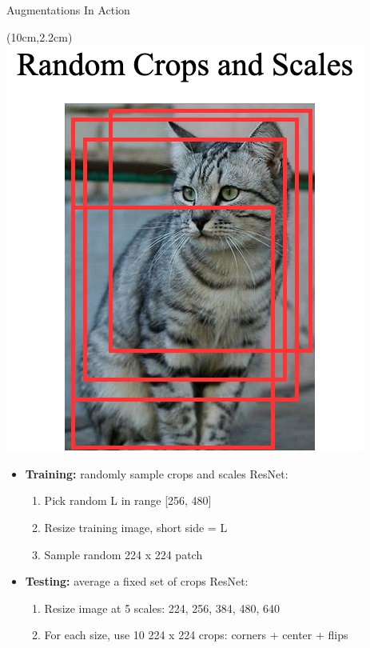 \documentclass[serif, aspectratio=169]{beamer}
\begin{document}
\begin{frame}{Augmentations In Action}
	\begin{textblock*}{5cm}(10cm,2.2cm) %
		\includegraphics[keepaspectratio, scale=0.28]{pic/crop}
	\end{textblock*}

	\begin{itemize}
	\item \textbf{Training:} randomly sample crops and scales \newline ResNet:
		\begin{enumerate}
				\item Pick random L in range [256, 480]
				\item Resize training image, short side = L
				\item Sample random 224 x 224 patch
		\end{enumerate}
		
	\item \textbf{Testing:} average a fixed set of crops \newline ResNet:
		\begin{enumerate}
			\item Resize image at 5 scales: {224, 256, 384, 480, 640}
			\item For each size, use 10 224 x 224 crops:  corners + center + flips
		\end{enumerate}				
	\end{itemize}
\end{frame}
\end{document}
